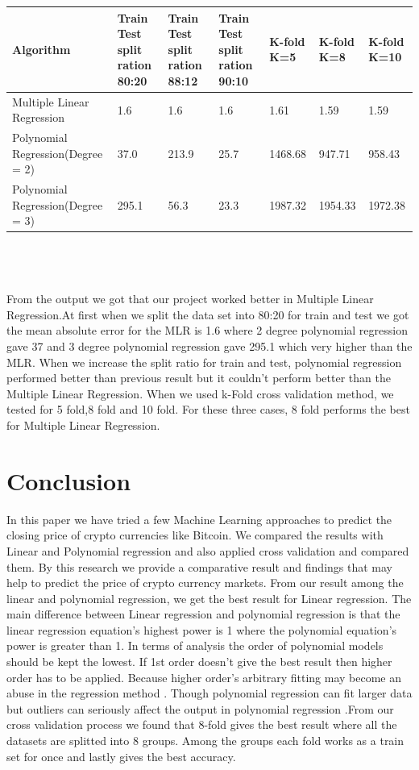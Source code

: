 \documentclass{IEEEtran}
\begin{document}
\begin{tabular} { | m{15em} | m{5em}| m{5em} | m{5em} | m{3em}| m{3em} | m{3em} | } 
\hline
Algorithm & Train Test split ration 80:20 & Train Test split ration 88:12 & Train Test split ration 90:10 & K-fold K=5 & K-fold K=8 & K-fold K=10 \\
\hline
Multiple Linear Regression & 1.6 & 1.6 & 1.6 & 1.61 & 1.59 & 1.59 \\
\hline
Polynomial Regression(Degree = 2) & 37.0 & 213.9 & 25.7 & 1468.68 & 947.71 & 958.43 \\
\hline
Polynomial Regression(Degree = 3) & 295.1 & 56.3 & 23.3 & 1987.32 & 1954.33 & 1972.38 \\
\hline

\end{tabular}
\\
\\\\From the output we got that our project worked better in Multiple Linear Regression.At first when we split the data set into 80:20 for train and test we got the mean absolute error for the MLR is 1.6 where 2 degree polynomial regression gave 37 and 3 degree polynomial regression gave 295.1 which very higher than the MLR. When we increase the split ratio for train and test, polynomial regression performed better than previous result but it couldn't perform better than the Multiple Linear Regression. 
When we used k-Fold cross validation method, we tested for 5 fold,8 fold and 10 fold. For these three cases, 8 fold performs the best for Multiple Linear Regression.\\
\section{Conclusion}
In this paper we have tried a few Machine Learning approaches to predict the closing price of crypto currencies like Bitcoin. We compared the results with Linear and Polynomial regression and also applied cross validation and compared them. By this research we provide a comparative result and findings that may help to predict the price of crypto currency markets. From our result among the linear and polynomial regression, we get the best result for Linear regression. The main difference between Linear regression and polynomial regression is that the linear regression equation’s highest power is 1 where the polynomial equation’s power is greater than 1. In terms of analysis the order of polynomial models should be kept the lowest. If 1st order doesn't give the best result then higher order has to be applied. Because higher order’s arbitrary fitting may become an abuse in the regression method \cite{Shalabh}. Though polynomial regression can fit larger data but outliers can seriously affect the output in polynomial regression \cite{Pant2019}.From our cross validation process we found that 8-fold gives the best result where all the datasets are splitted into 8 groups. Among the groups each fold works as a train set for once and lastly gives the best accuracy. 
\clearpage
\end{document}
